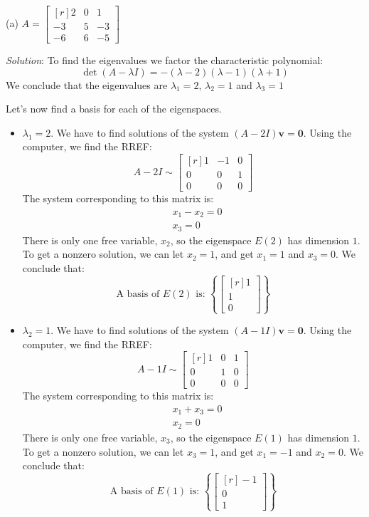 \documentclass[12pt]{article}
\begin{document}
\medskip
(a) $A=\left[\begin{matrix*}[r]2 & 0 & 1\\-3 & 5 & -3\\-6 & 6 & -5\end{matrix*}\right]$

\emph{Solution}:
To find the eigenvalues we factor the characteristic polynomial:
\[
\det(A-\lambda I)=- \left(\lambda - 2\right) \left(\lambda - 1\right) \left(\lambda + 1\right)
\]
We conclude that the eigenvalues are $\lambda_1=2$, $\lambda_2=1$ and $\lambda_3=1$

Let's now find a basis for each of the eigenspaces.

\begin{itemize}

\item $\lambda_1=2$. We have to find solutions of the system $(A-2I)\mathbf{v}=\mathbf{0}$. Using the computer, we find the RREF:
\[
A-2I\sim\left[\begin{matrix*}[r]1 & -1 & 0\\0 & 0 & 1\\0 & 0 & 0\end{matrix*}\right]
\]
The system corresponding to this matrix is:
\begin{align*}
&x_1-x_2=0\\
&x_3=0
\end{align*}
There is only one free variable, $x_2$, so the eigenspace $E(2)$ has dimension $1$.
To get a nonzero solution, we can let $x_2=1$, and get $x_1=1$ and $x_3=0$. We conclude that:
\[
\text{A basis of $E(2)$ is: } \left\{\begin{bmatrix*}[r]1\\1\\0\end{bmatrix*}\right\}
\]

\item $\lambda_2=1$. We have to find solutions of the system $(A-1I)\mathbf{v}=\mathbf{0}$. Using the computer, we find the RREF:
\[
A-1I\sim\left[\begin{matrix*}[r]1 & 0 & 1\\0 & 1 & 0\\0 & 0 & 0\end{matrix*}\right]
\]
The system corresponding to this matrix is:
\begin{align*}
&x_1+x_3=0\\
&x_2=0
\end{align*}
There is only one free variable, $x_3$, so the eigenspace $E(1)$ has dimension $1$.
To get a nonzero solution, we can let $x_3=1$, and get $x_1=-1$ and $x_2=0$. We conclude that:
\[
\text{A basis of $E(1)$ is: } \left\{\begin{bmatrix*}[r]-1\\0\\1\end{bmatrix*}\right\}
\]


\end{itemize}
\end{document}
